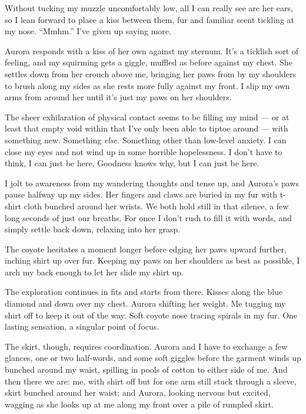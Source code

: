 Without tucking my muzzle uncomfortably low, all I can really see are her ears, so I lean forward to place a kiss between them, fur and familiar scent tickling at my nose. ``Mmhm.'' I've given up saying more.

Aurora responds with a kiss of her own against my sternum. It's a ticklish sort of feeling, and my squirming gets a giggle, muffled as before against my chest. She settles down from her crouch above me, bringing her paws from by my shoulders to brush along my sides as she rests more fully against my front. I slip my own arms from around her until it's just my paws on her shoulders.

The sheer exhilaration of physical contact seems to be filling my mind --- or at least that empty void within that I've only been able to tiptoe around --- with something new. Something \emph{else.} Something other than low-level anxiety. I can close my eyes and not wind up in some horrible hopelessness. I don't have to think, I can just be here. Goodness knows why, but I can just be here.

I jolt to awareness from my wandering thoughts and tense up, and Aurora's paws pause halfway up my sides. Her fingers and claws are buried in my fur with t-shirt cloth bunched around her wrists. We both hold still in that silence, a few long seconds of just our breaths. For once I don't rush to fill it with words, and simply settle back down, relaxing into her grasp.

The coyote hesitates a moment longer before edging her paws upward further, inching shirt up over fur. Keeping my paws on her shoulders as best as possible, I arch my back enough to let her slide my shirt up.

The exploration continues in fits and starts from there. Kisses along the blue diamond and down over my chest. Aurora shifting her weight. Me tugging my shirt off to keep it out of the way. Soft coyote nose tracing spirals in my fur. One lasting sensation, a singular point of focus.

The skirt, though, requires coordination. Aurora and I have to exchange a few glances, one or two half-words, and some soft giggles before the garment winds up bunched around my waist, spilling in pools of cotton to either side of me. And then there we are: me, with shirt off but for one arm still stuck through a sleeve, skirt bunched around her waist; and Aurora, looking nervous but excited, wagging as she looks up at me along my front over a pile of rumpled skirt.

